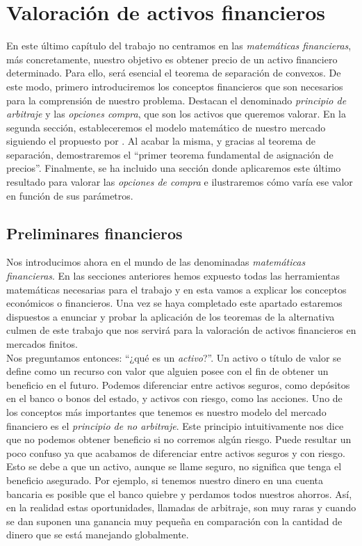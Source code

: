 \chapter{Valoración de activos financieros}
En este último capítulo del trabajo no centramos en las \textit{matemáticas financieras}, más concretamente, nuestro objetivo es obtener precio de un activo financiero determinado. Para ello, será esencial el teorema de separación de convexos. De este modo, primero introduciremos los conceptos financieros que son necesarios para la comprensión de nuestro problema. Destacan el denominado \textit{principio de arbitraje} y las \textit{opciones compra}, que son los activos que queremos valorar. En la segunda sección, estableceremos el modelo matemático de nuestro mercado siguiendo el propuesto por \cite{elliot1999mathematics}. Al acabar la misma, y gracias al teorema de separación, demostraremos el ``primer teorema fundamental de asignación de precios''. Finalmente, se ha incluido una sección donde aplicaremos este último resultado para valorar las \textit{opciones de compra} e ilustraremos cómo varía ese valor en función de sus parámetros.

\section{Preliminares financieros}
Nos introducimos ahora en el mundo de las denominadas \textit{matemáticas financieras}. En las secciones anteriores hemos expuesto todas las herramientas matemáticas necesarias para el trabajo y en esta vamos a explicar los conceptos económicos o financieros. Una vez se haya completado este apartado estaremos dispuestos a enunciar y probar la aplicación de los teoremas de la alternativa culmen de este trabajo que nos servirá para la valoración de activos financieros en mercados finitos. \\

Nos preguntamos entonces: ``¿qué es un \textit{activo}?''. Un activo o título de valor se define como un recurso con valor que alguien posee con el fin de obtener un beneficio en el futuro. Podemos diferenciar entre activos seguros, como depósitos en el banco o bonos del estado, y activos con riesgo, como las acciones. Uno de los conceptos más importantes que tenemos es nuestro modelo del mercado financiero es el \textit{principio de no arbitraje}. Este principio intuitivamente nos dice que no podemos obtener beneficio si no corremos algún riesgo. Puede resultar un poco confuso ya que acabamos de diferenciar entre activos seguros y con riesgo. Esto se debe a que un activo, aunque se llame seguro, no significa que tenga el  beneficio asegurado. Por ejemplo, si tenemos nuestro dinero en una cuenta bancaria es posible que el banco quiebre y perdamos todos nuestros ahorros. Así, en la realidad estas oportunidades, llamadas de arbitraje, son muy raras y cuando se dan suponen una ganancia muy pequeña en comparación con la cantidad de dinero que se está manejando globalmente.\\

